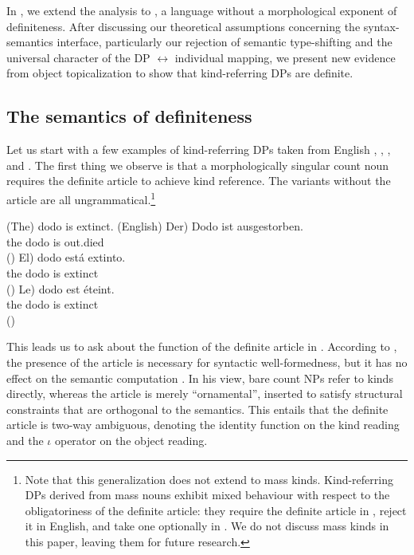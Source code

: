 \documentclass[output=paper]{langscibook}
\begin{document}
In , we extend the analysis to , a language without a morphological exponent of definiteness. After discussing our theoretical assumptions concerning the syntax-semantics interface, particularly our rejection of semantic type-shifting and the universal character of the DP $\leftrightarrow$ individual mapping, we present new evidence from object topicalization to show that  kind-referring DPs are definite.

\subsection{The semantics of definiteness}
\label{sec:sem_def}

Let us start with a few examples of kind-referring DPs taken from English ,  ,  , and  . The first thing we observe is that a morphologically singular count noun requires the definite article to achieve kind reference. The variants without the article are all ungrammatical.\footnote{Note that this generalization does not extend to mass kinds. Kind-referring DPs derived from mass nouns exhibit mixed behaviour with respect to the obligatoriness of the definite article: they require the definite article in , reject it in English, and take one optionally in . We do not discuss mass kinds in this paper, leaving them for future research.}

\ea \label{ex:kind-ref-crossling}
\ea *(The) dodo is extinct.\label{ex:kind-ref-en} \hfill (English)
\ex \gll \minsp{*(} Der) Dodo ist ausgestorben.\label{ex:kind-ref-ger}\\
{} the dodo is out.died \\ \hfill ()
\ex  \gll \minsp{*(} El) dodo está extinto.\label{ex:kind-ref-spa}\\
       {} the dodo is extinct\\ \hfill ()
\ex \gll \minsp{*(} Le) dodo est éteint.\label{ex:kind-ref-fr}\\
       {} the dodo is extinct\\ \hfill ()
\z\z

\noindent
This leads us to ask about the function of the definite article in . According to \citet{Krifka1995}, the presence of the article is necessary for syntactic well-formedness, but it has no effect on the semantic computation . In his view, bare count NPs refer to kinds directly, whereas the article is merely ``ornamental'', inserted to satisfy structural constraints that are orthogonal to the semantics. This entails that the definite article is two-way ambiguous, denoting the identity function on the kind reading and the $\iota$ operator on the object reading.
\end{document}
